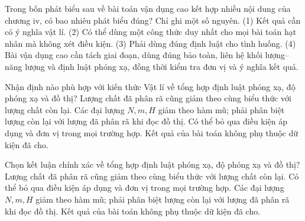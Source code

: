 \begin{ex}
Trong bốn phát biểu sau về bài toán vận dụng cao kết hợp nhiều nội dung của chương iv, có bao nhiêu phát biểu đúng? Chỉ ghi một số nguyên. (1) Kết quả cần có ý nghĩa vật lí. (2) Có thể dùng một công thức duy nhất cho mọi bài toán hạt nhân mà không xét điều kiện. (3) Phải dùng đúng định luật cho tình huống. (4) Bài vận dụng cao cần tách giai đoạn, dùng đúng bảo toàn, liên hệ khối lượng–năng lượng và định luật phóng xạ, đồng thời kiểm tra đơn vị và ý nghĩa kết quả.
\end{ex}

\begin{ex}
Nhận định nào phù hợp với kiến thức Vật lí về tổng hợp định luật phóng xạ, độ phóng xạ và đồ thị?
\choice
{Lượng chất đã phân rã cũng giảm theo cùng biểu thức với lượng chất còn lại.}
{\True Các đại lượng $N,m,H$ giảm theo hàm mũ; phải phân biệt lượng còn lại với lượng đã phân rã khi đọc đồ thị.}
{Có thể bỏ qua điều kiện áp dụng và đơn vị trong mọi trường hợp.}
{Kết quả của bài toán không phụ thuộc dữ kiện đã cho.}
\end{ex}

\begin{ex}
Chọn kết luận chính xác về tổng hợp định luật phóng xạ, độ phóng xạ và đồ thị?
\choice
{Lượng chất đã phân rã cũng giảm theo cùng biểu thức với lượng chất còn lại.}
{Có thể bỏ qua điều kiện áp dụng và đơn vị trong mọi trường hợp.}
{\True Các đại lượng $N,m,H$ giảm theo hàm mũ; phải phân biệt lượng còn lại với lượng đã phân rã khi đọc đồ thị.}
{Kết quả của bài toán không phụ thuộc dữ kiện đã cho.}
\end{ex}

